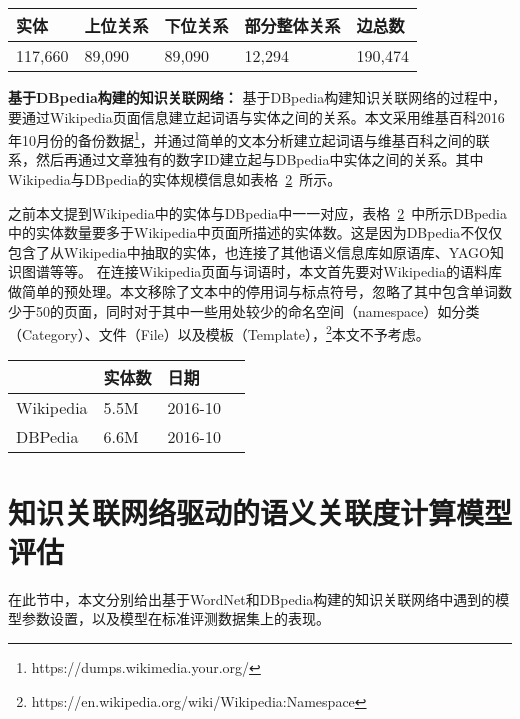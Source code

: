 \begin{table}[htbp]
    \center
    \vspace{5pt}
    \begin{tabular}{|p{1.6cm}|p{1.6cm}|p{1.6cm}|p{2.5cm}|p{1.6cm}|}
    \hline
    实体   & 上位关系 & 下位关系 & 部分整体关系 & 边总数   \\ \hline
    117,660   & 89,090 & 89,090 & 12,294 & 190,474    \\ \hline
    \end{tabular}
    \label{wordnet_data}
\end{table}

\textbf{基于DBpedia构建的知识关联网络：}
基于DBpedia构建知识关联网络的过程中，要通过Wikipedia页面信息建立起词语与实体之间的关系。本文采用维基百科2016年10月份的备份数据\footnote{https://dumps.wikimedia.your.org/}，并通过简单的文本分析建立起词语与维基百科之间的联系，然后再通过文章独有的数字ID建立起与DBpedia中实体之间的关系。其中Wikipedia与DBpedia的实体规模信息如表格~\ref{wiki_data}~所示。

之前本文提到Wikipedia中的实体与DBpedia中一一对应，表格~\ref{wiki_data}~中所示DBpedia中的实体数量要多于Wikipedia中页面所描述的实体数。这是因为DBpedia不仅仅包含了从Wikipedia中抽取的实体，也连接了其他语义信息库如原语库、YAGO知识图谱等等。
在连接Wikipedia页面与词语时，本文首先要对Wikipedia的语料库做简单的预处理。本文移除了文本中的停用词与标点符号，忽略了其中包含单词数少于50的页面，同时对于其中一些用处较少的命名空间（namespace）如分类（Category）、文件（File）以及模板（Template），\footnote{https://en.wikipedia.org/wiki/Wikipedia:Namespace}本文不予考虑。

\begin{table}[htbp]
    \center
    \vspace{5pt}
    \begin{tabular}{|p{2cm}|p{2cm}|p{2cm}|p{2cm}|}
    \hline
              & 实体数    & 日期        \\ \hline
    Wikipedia & 5.5M     & 2016-10     \\ \hline
    DBPedia   & 6.6M     & 2016-10     \\ \hline
    \end{tabular}
    \label{wiki_data}
\end{table}


\section{知识关联网络驱动的语义关联度计算模型评估}
在此节中，本文分别给出基于WordNet和DBpedia构建的知识关联网络中遇到的模型参数设置，以及模型在标准评测数据集上的表现。

